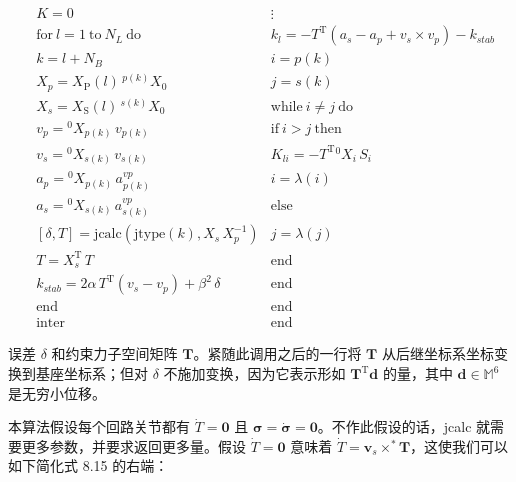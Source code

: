 \documentclass[10pt,a4paper]{book}
\theoremstyle{thmstyle} %
\theoremstyle{defstyle} %
\theoremstyle{prostyle} %
\begin{document}
$$
\begin{array}{rlr} & { K = 0 } & { \vdots } \\& { \mathrm { f o r ~ } l = 1 \mathrm { ~ t o ~ } N _ { L } \mathrm { ~ d o ~ } } & { k _ { l } = - T ^{\mathrm { T} } ( a _ { s } - a _ { p } + v _ { s } \times v _ { p } ) - k _ { s t a b } } \\& { k = l + N _ { B } } & { i = p ( k ) } \\& { X _ { p } = X _ { \mathrm { P } } ( l ) \, ^{p ( k )} X _ { 0 } } & { j = s ( k ) } \\& { X _ { s } = X _ { \mathrm { S } } ( l ) \, ^{s ( k )} X _ { 0 } } & { \mathrm { w h i l e ~ } i \neq j \mathrm { ~ d o ~ } } \\& { v _ { p } = { } ^{0} X _ { p ( k ) } \, v _ { p ( k ) } } & { \mathrm { i f ~ } i > j \mathrm { ~ t h e n ~ } } \\& { v _ { s } = { } ^{0} X _ { s ( k ) } \, v _ { s ( k ) } } & { K _ { l i } = - T ^{\mathrm { T} } { } ^{0} X _ { i } \, S _ { i } } \\& { a _ { p } = { } ^{0} X _ { p ( k ) } \, a _ { p ( k ) } ^{v p} } & { i = \lambda ( i ) } \\& { a _ { s } = { } ^{0} X _ { s ( k ) } \, a _ { s ( k ) } ^{v p} } & { \mathrm { e l s e } } \\& { [ \delta , T ] = \mathrm { j c a l c } ( \mathrm { j t y p e } ( k ) , X _ { s } \, X _ { p } ^{- 1} ) } & { j = \lambda ( j ) } \\& { T = X _ { s } ^{\mathrm { T} } \, T } & { \mathrm { e n d } } \\& { k _ { s t a b } = 2 \alpha \, T ^{\mathrm { T} } ( v _ { s } - v _ { p } ) + \beta ^{2} \, \delta } & { \mathrm { e n d } } \\& { \mathrm { e n d } } & { \mathrm { e n d } } \\& { \mathrm { i n t e r } } & { \mathrm { e n d } } \end{array}
$$



误差 $\delta$ 和约束力子空间矩阵 $\boldsymbol{T}$。紧随此调用之后的一行将 $\boldsymbol{T}$ 从后继坐标系坐标变换到基座坐标系；但对 $\delta$ 不施加变换，因为它表示形如 $\boldsymbol{T}^{\mathrm{T}}\boldsymbol{d}$ 的量，其中 $\boldsymbol{d} \in \mathbb{M}^{6}$ 是无穷小位移。



本算法假设每个回路关节都有 $\dot{T} = \mathbf{0}$ 且 $\boldsymbol{\sigma} = \dot{\boldsymbol{\sigma}} = \mathbf{0}$。不作此假设的话，jcalc 就需要更多参数，并要求返回更多量。假设 $\dot{T} = \mathbf{0}$ 意味着 $\dot{T} = \boldsymbol{v}_s \times^* \boldsymbol{T}$，这使我们可以如下简化式 8.15 的右端：
\end{document}

